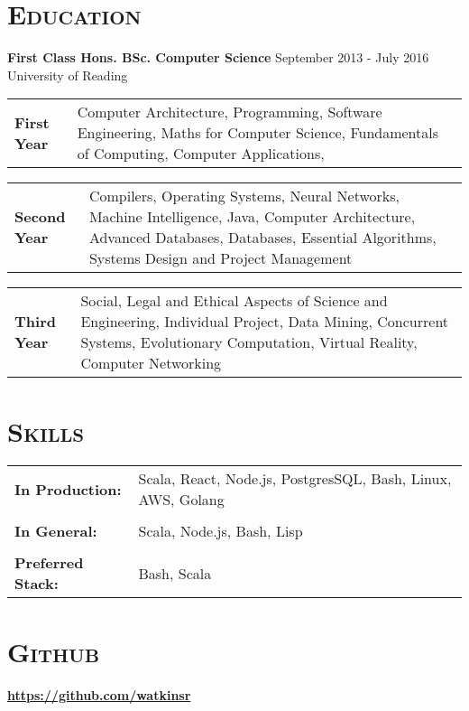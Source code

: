 \documentclass[line, margin, 10pt]{res}
\begin{document}
\begin{resume}
\section{\textsc{Education}}
{\bf First Class Hons. BSc. Computer Science}  {\hfill September 2013 - July 2016}\\
University of Reading

\begin{tabular}[t]{@{} p{1.2in} p{4.5in} @{}}
\bf{First Year}  & Computer Architecture,
  Programming, 
  Software Engineering,
  Maths for Computer Science,
  Fundamentals of Computing,
  Computer Applications,
\end{tabular}

\begin{tabular}[t]{@{} p{1.2in} p{4.5in} @{}}  
\bf{Second Year}  & Compilers,
  Operating Systems,
  Neural Networks,
  Machine Intelligence,
  Java,
  Computer Architecture,
  Advanced Databases,
  Databases,
  Essential Algorithms,
  Systems Design and Project Management
\end{tabular}

\begin{tabular}[t]{@{} p{1.2in} p{4.5in} @{}}  
\bf{Third Year}  & Social, Legal and Ethical Aspects of Science and Engineering,
  Individual Project,
  Data Mining,
  Concurrent Systems,  
  Evolutionary Computation,
  Virtual Reality,
  Computer Networking
\end{tabular}

\section{\textsc{Skills}}
   \begin{tabular}[t]{@{} p{1.2in} p{3.75in} @{}}
     \bf{In Production:} & Scala, React, Node.js, PostgresSQL, Bash, Linux, AWS, Golang \\
    \\
    \bf{In General:} & Scala, Node.js, Bash, Lisp  \\
    \\
    \bf{Preferred Stack:} & Bash, Scala \\
 \end{tabular}

\section{\textsc{Github}}
{\bf \url{https://github.com/watkinsr}}\\


\end{resume}
\end{document}
